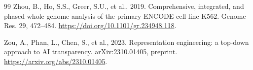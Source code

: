 \documentclass[review,authoryear,12pt]{elsarticle}
\begin{document}
\begin{thebibliography}{99}
 Zhou, B., Ho, S.S., Greer, S.U., et al., 2019. Comprehensive, integrated, and phased whole-genome analysis of the primary ENCODE cell line K562. Genome Res. 29, 472--484. \url{https://doi.org/10.1101/gr.234948.118}.

 Zou, A., Phan, L., Chen, S., et al., 2023. Representation engineering: a top-down approach to AI transparency. arXiv:2310.01405, preprint. \url{https://arxiv.org/abs/2310.01405}.

\end{thebibliography}
\end{document}
